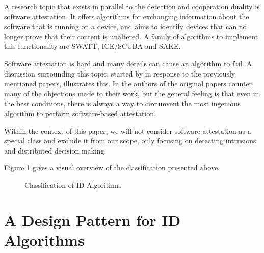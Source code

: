\documentclass[conference]{IEEEtran}
\begin{document}
A research topic that exists in parallel to the detection and cooperation
duality is software attestation. It offers algorithms for exchanging
information about the software that is running on a device, and aims to
identify devices that can no longer prove that their content is unaltered. A
family of algorithms to implement this functionality are
SWATT\cite{seshadri2004swatt}, ICE/SCUBA\cite{seshadri2006scuba} and
SAKE\cite{seshadri2008sake}.

Software attestation is hard and many details can cause an algorithm to fail. A
discussion surrounding this topic, started by \cite{castelluccia2009difficulty}
in response to the previously mentioned papers, illustrates this. In
\cite{perrig2010refutation} the authors of the original papers counter many of
the objections made to their work, but the general feeling is that even in the
best conditions, there is always a way to circumvent the most ingenious
algorithm to perform software-based attestation.

Within the context of this paper, we will not consider software attestation as
a special class and exclude it from our scope, only focusing on detecting
intrusions and distributed decision making.

Figure \ref{fig:classification} gives a visual overview of the classification
presented above.

\begin{figure}[!ht]
  \centering
  \caption{Classification of ID Algorithms}
  \label{fig:classification}
\end{figure}

\section{A Design Pattern for ID Algorithms}
\label{pattern}
\end{document}
